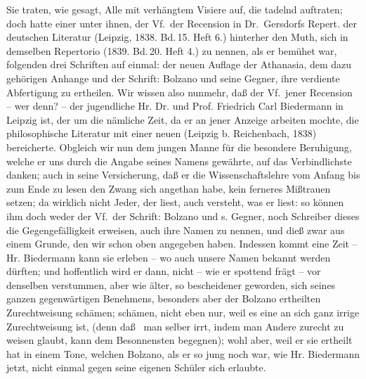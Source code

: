 {	Sie traten, wie gesagt, Alle mit verhängtem Visiere auf, die tadelnd auftraten; doch hatte einer unter ihnen, der Vf.\ der Recension in Dr.~Gersdorfs Repert. der deutschen Literatur (Leipzig, 1838. Bd.\,15. Heft 6.) hinterher den Muth, sich in demselben Repertorio (1839. Bd.\,20. Heft 4.) zu nennen, als er bemühet war, folgenden drei Schriften auf einmal: der neuen Auflage der Athanasia, dem dazu gehörigen Anhange und der Schrift: Bolzano und seine Gegner, ihre verdiente Abfertigung zu ertheilen. Wir wissen also nunmehr, daß der Vf.\ jener Recension -- wer denn? -- der jugendliche Hr. Dr. und Prof. Friedrich Carl Biedermann in Leipzig ist, der um die nämliche Zeit, da er an jener Anzeige arbeiten mochte, die philosophische Literatur mit einer neuen  (Leipzig b. Reichenbach, 1838) bereicherte. Obgleich wir nun dem jungen Manne für die besondere Beruhigung, welche er uns durch die Angabe seines Namens gewährte, auf das Verbindlichste danken; auch in seine Versicherung, daß er die Wissenschaftslehre vom Anfang bis zum Ende zu lesen den Zwang sich angethan habe, kein ferneres Mißtrauen setzen; da wirklich nicht Jeder, der liest, auch versteht, was er liest: so können ihm doch weder der Vf.\ der Schrift: Bolzano und s. Gegner, noch Schreiber dieses die Gegengefälligkeit erweisen, auch ihre Namen zu nennen, und dieß zwar aus einem Grunde, den wir schon oben angegeben haben. Indessen kommt eine Zeit -- Hr. Biedermann kann sie erleben -- wo auch unsere Namen bekannt werden dürften; und hoffentlich wird er dann, nicht -- wie er spottend frägt -- vor denselben verstummen, aber wie älter, so bescheidener geworden, sich seines ganzen gegenwärtigen Benehmens, besonders aber der Bolzano ertheilten Zurechtweisung schämen; schämen, nicht eben nur, weil es eine an sich ganz irrige Zurechtweisung ist, (denn daß \BUSeitenwmarkierung\ man selber irrt, indem man Andere zurecht zu weisen glaubt, kann dem Besonnensten begegnen); wohl aber, weil er sie ertheilt hat in einem Tone, welchen Bolzano, als er so jung noch war, wie Hr. Biedermann jetzt, nicht einmal gegen seine eigenen Schüler sich erlaubte. \par
}
